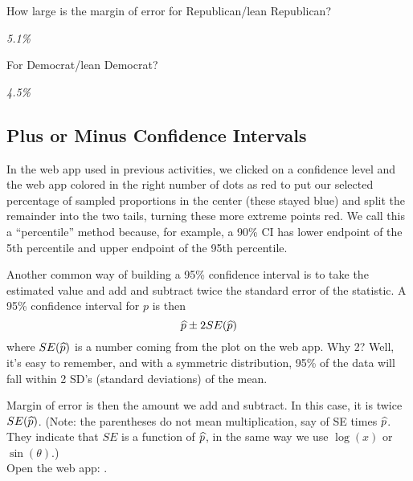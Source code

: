  How large is the margin of error for Republican/lean Republican?
\begin{students}
\vspace{.8cm}
\end{students}

\begin{key}
  {\em 5.1\%}
\end{key}

 For  Democrat/lean Democrat?
\begin{students}
\vspace{.8cm}
\end{students}

\begin{key}
  {\em 4.5\%}
\end{key}

\newpage

\subsection{ Plus or Minus Confidence Intervals}


In the web app used in previous activities, we clicked on a confidence
level and the web app colored in the right number of dots as red to
put our selected percentage of sampled proportions in the center
(these stayed blue) and split the remainder into the two tails,
turning these more extreme points red.  We call this a ``percentile''
method because, for example, a 90\% CI has lower endpoint of the 5th
percentile and upper endpoint of the 95th percentile.

Another common way of building a 95\% confidence interval is to take
the estimated value and add and subtract twice the standard error of
the statistic.  A 95\% confidence interval for $p$ is then
 $$ \widehat{p} \pm 2 SE(\widehat{p})$$
where $SE(\widehat{p})$ is a number coming from the plot on the web app.
Why 2?  Well, it's easy to remember, and with a symmetric
distribution, 95\% of the data will fall within 2 SD's (standard
deviations) of the mean.

Margin of error is then the amount we add and subtract.  In this case,
it is twice $SE(\widehat{p})$.  (Note: the parentheses do not mean
multiplication, say of SE times $\widehat{p}$. They indicate that $SE$ is a
function of $\widehat{p}$, in the same way we use $\log(x)$ or
$\sin(\theta)$.)\\
Open the web app: \webAppURLFrst .

